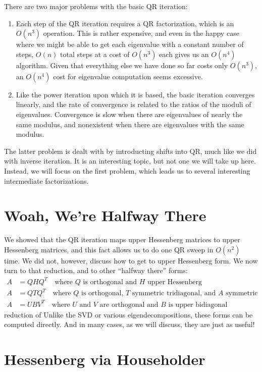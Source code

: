 \documentclass[12pt, leqno]{article} %
\begin{document}
There are two major problems with the basic QR iteration:
\begin{enumerate}
\item
  Each step of the QR iteration requires a QR factorization, which is
  an $O(n^3)$ operation.  This is rather expensive, and even in the happy
  case where we might be able to get each eigenvalue with a constant
  number of steps, $O(n)$ total steps at a cost of $O(n^3)$ each gives
  us an $O(n^4)$ algorithm.  Given that everything else we have done
  so far costs only $O(n^3)$, an $O(n^4)$ cost for eigenvalue computation
  seems excessive.
\item
  Like the power iteration upon which it is based, the basic iteration
  converges linearly, and the rate of convergence is related to the
  ratios of the moduli of eigenvalues.  Convergence is slow when there
  are eigenvalues of nearly the same modulus, and nonexistent when
  there are eigenvalues with the same modulus.
\end{enumerate}
The latter problem is dealt with by introducting shifts into QR,
much like we did with inverse iteration.  It is an interesting topic,
but not one we will take up here.  Instead, we will focus on the first
problem, which leads us to several interesting intermediate factorizations.

\section{Woah, We're Halfway There}

We showed that the QR iteration maps upper Hessenberg
matrices to upper Hessenberg matrices, and this fact allows us to do
one QR sweep in $O(n^2)$ time.  We did not, however, discuss how to
get to upper Hessenberg form.  We now turn to that
reduction, and to other ``halfway there'' forms:
\begin{align*}
  A &= Q H Q^T \quad \mbox{where $Q$ is orthogonal and $H$ upper
    Hessenberg} \\
  A &= Q T Q^T \quad \mbox{where $Q$ is orthogonal, $T$ symmetric
    tridiagonal, and $A$ symmetric} \\
  A &= U B V^T \quad \mbox{where $U$ and $V$ are orthogonal and $B$ is
    upper bidiagonal}
\end{align*}
reduction of
Unlike the SVD or various eigendecompositions, these forms can be
computed directly.  And in many cases, as we will discuss, they are
just as useful!

\section{Hessenberg via Householder}
\end{document}
